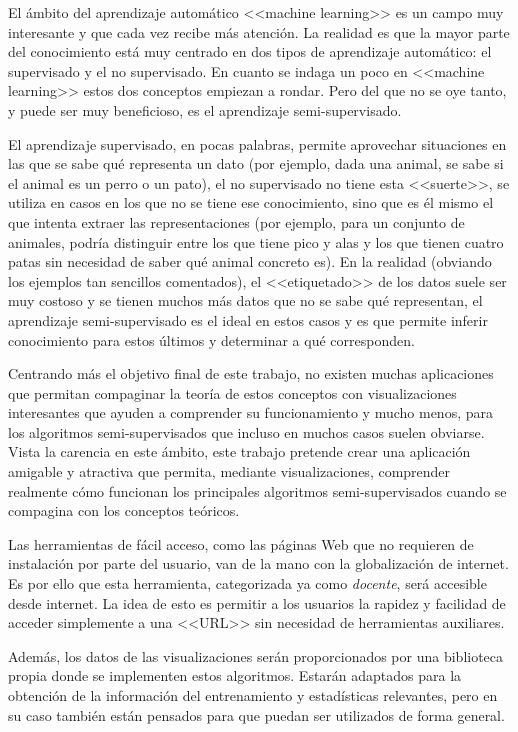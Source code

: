 
El ámbito del aprendizaje automático <<machine learning>> es un campo muy
interesante y que cada vez recibe más atención. La realidad es que la mayor
parte del conocimiento está muy centrado en dos tipos de aprendizaje automático:
el supervisado y el no supervisado. En cuanto se indaga un poco en <<machine
learning>> estos dos conceptos empiezan a rondar. Pero del que no se oye tanto,
y puede ser muy beneficioso, es el aprendizaje semi-supervisado. 

El aprendizaje supervisado, en pocas palabras, permite aprovechar situaciones en
las que se sabe qué representa un dato (por ejemplo, dada una animal, se sabe si
el animal es un perro o un pato), el no supervisado no tiene esta <<suerte>>, se
utiliza en casos en los que no se tiene ese conocimiento, sino que es él mismo
el que intenta extraer las representaciones (por ejemplo, para un conjunto de
animales, podría distinguir entre los que tiene pico y alas y los que tienen
cuatro patas sin necesidad de saber qué animal concreto es). En la realidad
(obviando los ejemplos tan sencillos comentados), el <<etiquetado>> de los datos
suele ser muy costoso y se tienen muchos más datos que no se sabe qué
representan, el aprendizaje semi-supervisado es el ideal en estos casos y es que
permite inferir conocimiento para estos últimos y determinar a qué corresponden.

Centrando más el objetivo final de este trabajo, no existen muchas aplicaciones
que permitan compaginar la teoría de estos conceptos con visualizaciones
interesantes que ayuden a comprender su funcionamiento y mucho menos, para los
algoritmos semi-supervisados que incluso en muchos casos suelen obviarse. Vista
la carencia en este ámbito, este trabajo pretende crear una aplicación amigable
y atractiva que permita, mediante visualizaciones, comprender realmente cómo
funcionan los principales algoritmos semi-supervisados cuando se compagina con
los conceptos teóricos.

Las herramientas de fácil acceso, como las páginas Web que no requieren de
instalación por parte del usuario, van de la mano con la globalización de
internet. Es por ello que esta herramienta, categorizada ya como
\textit{docente}, será accesible desde internet. La idea de esto es permitir a
los usuarios la rapidez y facilidad de acceder simplemente a una <<URL>> sin
necesidad de herramientas auxiliares.

Además, los datos de las visualizaciones serán proporcionados por una biblioteca
propia donde se implementen estos algoritmos. Estarán adaptados para la
obtención de la información del entrenamiento y estadísticas relevantes, pero en
su caso también están pensados para que puedan ser utilizados de forma general.


